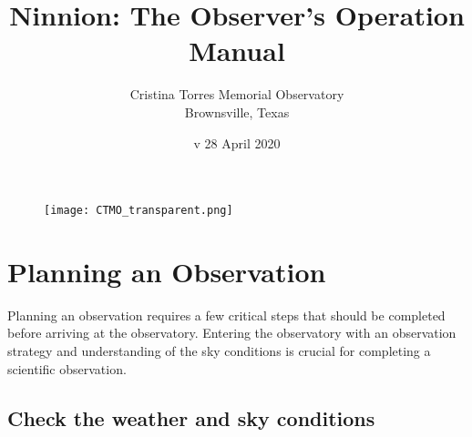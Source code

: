 \documentclass{article}
\title{Ninnion: The Observer's Operation Manual}
\author{Cristina Torres Memorial Observatory \\
	Brownsville, Texas}
\date{v 28 April 2020}
\begin{document}
	
	\maketitle
	
	\begin{figure}[b]
		\centering
		\texttt{[image: CTMO\_transparent.png]}
	\end{figure}
	
	\newpage
	\tableofcontents
	
	\newpage
	\section{Planning an Observation}
	
	Planning an observation requires a few critical steps that should be completed before arriving at the observatory. Entering the observatory with an observation strategy and understanding of the sky conditions is crucial for completing a scientific observation.
	
	\subsection{Check the weather and sky conditions}
	
\end{document}
